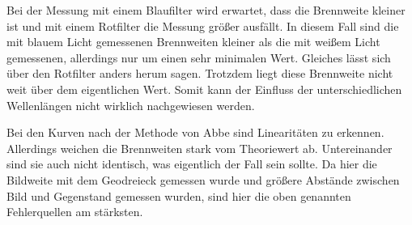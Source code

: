 Bei der Messung mit einem Blaufilter wird erwartet, dass die Brennweite kleiner ist und mit einem Rotfilter die Messung größer ausfällt. In diesem Fall sind die mit blauem Licht gemessenen Brennweiten kleiner als die mit weißem Licht gemessenen, allerdings nur um einen sehr minimalen Wert. Gleiches lässt
sich über den Rotfilter anders herum sagen. Trotzdem liegt diese Brennweite nicht weit über dem eigentlichen Wert. Somit kann der Einfluss der unterschiedlichen Wellenlängen nicht wirklich nachgewiesen werden.

Bei den Kurven nach der Methode von Abbe sind Linearitäten zu erkennen. Allerdings weichen die Brennweiten stark vom Theoriewert ab. Untereinander sind sie auch nicht identisch, was eigentlich der Fall sein sollte. Da hier die Bildweite mit dem Geodreieck gemessen wurde und größere Abstände zwischen Bild und Gegenstand gemessen wurden, sind hier die oben genannten Fehlerquellen am stärksten.

